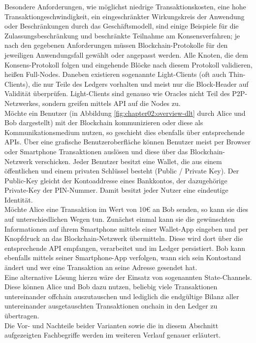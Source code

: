 Besondere Anforderungen, wie möglichst niedrige Transaktionskosten, eine hohe Transaktiongeschwindigkeit, ein eingeschränkter Wirkungskreis der Anwendung oder Beschränkungen durch das Geschäftsmodell, sind einige Beispiele für die Zulassungsbeschränkung und beschränkte Teilnahme am Konsensverfahren; je nach den gegebenen Anforderungen müssen Blockchain-Protokolle für den jeweiligen Anwendungsfall gewählt oder angepasst werden. Alle Knoten, die dem Konsens-Protokoll folgen und eingehende Blöcke nach diesem Protokoll validieren, heißen Full-Nodes. Daneben existieren sogenannte Light-Clients (oft auch Thin-Clients), die nur Teile des Ledgers vorhalten und meist nur die Block-Header auf Validität überprüfen. Light-Clients sind genauso wie Oracles nicht Teil des \ac{P2P}-Netzwerkes, sondern greifen mittels \ac{API} auf die Nodes zu.\\
Möchte ein Benutzer (in Abbildung \ref{fig:chapter02:overview-dlt} durch Alice und Bob dargestellt) mit der Blockchain kommunizieren oder diese als Kommunikationsmedium nutzen, so geschieht dies ebenfalls über entsprechende \ac{API}s. Über eine grafische Benutzeroberfläche können Benutzer meist per Browser oder Smartphone Transaktionen auslösen und diese über das Blockchain-Netzwerk verschicken. Jeder Benutzer besitzt eine Wallet, die aus einem öffentlichen und einem privaten Schlüssel besteht (Public / Private Key). Der Public-Key gleicht der Kontoaddresse eines Bankkontos, der dazugehörige Private-Key der PIN-Nummer. Damit besitzt jeder Nutzer eine eindeutige Identität.\\
Möchte Alice eine Transaktion im Wert von 10€ an Bob senden, so kann sie dies auf unterschiedlichen Wegen tun. Zunächst einmal kann sie die gewünschten Informationen auf ihrem Smartphone mittels einer Wallet-App eingeben und per Knopfdruck an das Blockchain-Netzwerk übermitteln. Diese wird dort über die entsprechende \ac{API} empfangen, verarbeitet und im Ledger persistiert. Bob kann ebenfalls mittels seiner Smartphone-App verfolgen, wann sich sein Kontostand ändert und wer eine Transaktion an seine Adresse gesendet hat.\\
Eine alternative Lösung hierzu wäre der Einsatz von sogenannten State-Channels. Diese können Alice und Bob dazu nutzen, beliebig viele Transaktionen untereinander offchain auszutauschen und lediglich die endgültige Bilanz aller untereinander ausgetauschten Transaktionen onchain in den Ledger zu übertragen.\\
Die Vor- und Nachteile beider Varianten sowie die in diesem Abschnitt aufgezeigten Fachbegriffe werden im weiteren Verlauf genauer erläutert.



